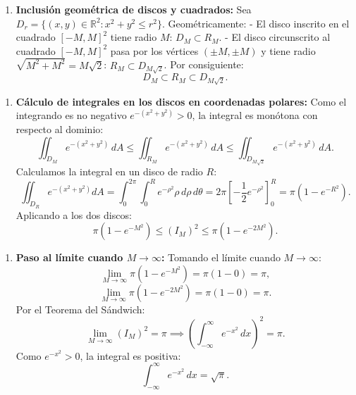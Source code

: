 \documentclass[11pt,a4paper]{article}
\begin{document}
\begin{enumerate}[label=\textbf{\arabic*.}]
\item \textbf{Inclusión geométrica de discos y cuadrados:}
Sea $D_r = \{(x,y) \in \mathbb{R}^2 : x^2 + y^2 \le r^2\}$.
Geométricamente:
- El disco inscrito en el cuadrado $[-M, M]^2$ tiene radio $M$: $D_M \subset R_M$.
- El disco circunscrito al cuadrado $[-M, M]^2$ pasa por los vértices $(\pm M, \pm M)$ y tiene radio $\sqrt{M^2 + M^2} = M\sqrt{2}$: $R_M \subset D_{M\sqrt{2}}$.
Por consiguiente:
\begin{equation*}
D_M \subset R_M \subset D_{M\sqrt{2}}.
\end{equation*}
\end{enumerate}

\begin{enumerate}[label=\textbf{\arabic*.}]
\item \textbf{Cálculo de integrales en los discos en coordenadas polares:}
Como el integrando es no negativo $e^{-(x^2+y^2)} > 0$, la integral es monótona con respecto al dominio:
\begin{equation*}
\iint_{D_M} e^{-(x^2 + y^2)} \, dA \le \iint_{R_M} e^{-(x^2 + y^2)} \, dA \le \iint_{D_{M\sqrt{2}}} e^{-(x^2 + y^2)} \, dA.
\end{equation*}
Calculamos la integral en un disco de radio $R$:
\begin{equation*}
\iint_{D_R} e^{-(x^2+y^2)} dA = \int_0^{2\pi} \int_0^R e^{-\rho^2} \rho \, d\rho \, d\theta = 2\pi \left[ -\frac{1}{2} e^{-\rho^2} \right]_0^R = \pi (1 - e^{-R^2}).
\end{equation*}
Aplicando a los dos discos:
\begin{equation*}
\pi (1 - e^{-M^2}) \le (I_M)^2 \le \pi (1 - e^{-2M^2}).
\end{equation*}
\end{enumerate}

\begin{enumerate}[label=\textbf{\arabic*.}]
\item \textbf{Paso al límite cuando $M \to \infty$:}
Tomando el límite cuando $M \to \infty$:
\begin{equation*}
\lim_{M\to\infty} \pi (1 - e^{-M^2}) = \pi (1 - 0) = \pi,
\end{equation*}
\begin{equation*}
\lim_{M\to\infty} \pi (1 - e^{-2M^2}) = \pi (1 - 0) = \pi.
\end{equation*}
Por el Teorema del Sándwich:
\begin{equation*}
\lim_{M\to\infty} (I_M)^2 = \pi \implies \left( \int_{-\infty}^\infty e^{-x^2} \, dx \right)^2 = \pi.
\end{equation*}
Como $e^{-x^2} > 0$, la integral es positiva:
\begin{equation*}
\int_{-\infty}^\infty e^{-x^2} \, dx = \sqrt{\pi}.
\end{equation*}
\end{enumerate}
\end{document}
